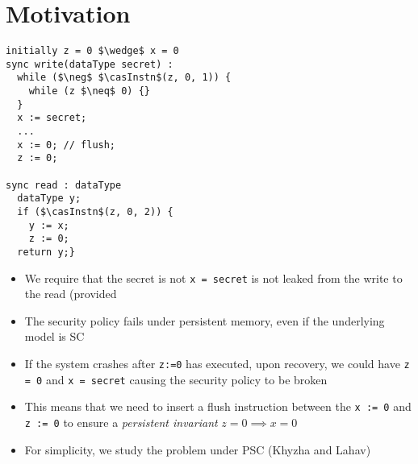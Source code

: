 \section{Motivation}





\begin{center}
\begin{minipage}{0.45\linewidth}
\begin{lstlisting}
initially z = 0 $\wedge$ x = 0
sync write(dataType secret) :
  while ($\neg$ $\casInstn$(z, 0, 1)) {
    while (z $\neq$ 0) {}
  }
  x := secret;
  ...
  x := 0; // flush;
  z := 0;

sync read : dataType
  dataType y;
  if ($\casInstn$(z, 0, 2)) {
    y := x;
    z := 0;
  return y;}\end{lstlisting}
\end{minipage}
\end{center}





\begin{itemize}
\item We require that the secret is not \verb|x = secret| is not leaked
  from the write to the read (provided 
\item The security policy fails under persistent memory, even if the
  underlying model is SC 
\item If the system crashes after \verb|z:=0| has executed, upon
  recovery, we could have \verb|z = 0| and \verb|x = secret| causing
  the security policy to be broken
  
\item This means that we need to insert a flush
  instruction between the \verb|x := 0| and \verb|z := 0| to ensure a
  {\em persistent invariant} $z = 0 \implies x = 0$ 
\item For simplicity, we study the problem under PSC (Khyzha and
  Lahav)
\end{itemize}


